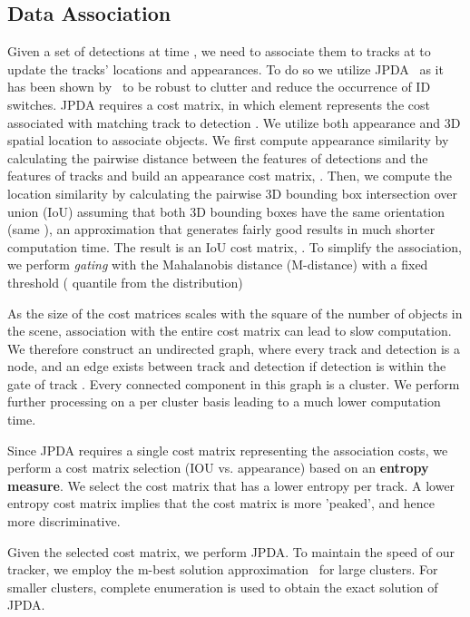 \documentclass[letterpaper, 10 pt, conference]{ieeeconf}
\begin{document}
\subsection{Data Association}
\label{ss:da}



Given a set of detections at time , we need to associate them to tracks at  to update the tracks' locations and appearances. To do so we utilize JPDA~\cite{fortmann1983sonar} as it has been shown by~\cite{rezatofighiiccv2015} to be robust to clutter and reduce the occurrence of ID switches. JPDA requires a cost matrix,  in which element  represents the cost associated with matching track   to detection .
We utilize both appearance and 3D spatial location to associate objects. We first compute appearance similarity by calculating the pairwise  distance between the  features of detections and the  features of tracks and build an appearance cost matrix, . Then, we compute the location similarity by calculating the pairwise 3D bounding box intersection over union (IoU) assuming that both 3D bounding boxes have the same orientation (same ), an approximation that generates fairly good results in much shorter computation time. The result is an IoU cost matrix, . To simplify the association, we perform \emph{gating} with the Mahalanobis distance (M-distance) with a fixed threshold ( quantile from the  distribution) 

As the size of the cost matrices scales with the square of the number of objects in the scene, association with the entire cost matrix can lead to slow computation. We therefore construct an undirected graph, where every track and detection is a node, and an edge exists between track  and detection  if detection  is within the gate of track . Every connected component in this graph is a cluster. We perform further processing on a per cluster basis leading to a much lower computation time.

Since JPDA requires a single cost matrix representing the association costs, we perform a cost matrix selection (IOU vs. appearance) based on an \textbf{entropy measure}. We select the cost matrix that has a lower entropy per track. A lower entropy cost matrix implies that the cost matrix is more 'peaked', and hence more discriminative.

Given the selected cost matrix, we perform JPDA. To maintain the speed of our tracker, we employ the m-best solution approximation~\cite{Rezatofighi:2016:CVPR} for large clusters. For smaller clusters, complete enumeration is used to obtain the exact solution of JPDA.
\end{document}
